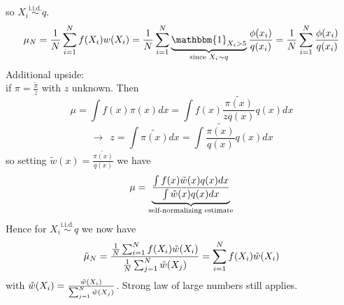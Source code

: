 \documentclass{article}
\begin{document}
	so $X_i \stackrel{\text{i.i.d.}}{\sim} q $.
	\begin{equation*}
		\mu_N= \frac{1}{N} \sum_{i=1}^N f(X_i)w(X_i) = \frac{1}{N} \sum_{i=1}^N \underbrace{\mathbbm{1}_{X_i>5} }_{\text{since } X_i \sim q }\frac{\phi(x_i)}{q(x_i)}  = \frac{1}{N} \sum_{i=1}^N\frac{\phi(x_i)}{q(x_i)} 
	\end{equation*}
	Additional upside:\\
	if $\pi= \frac{\tilde{\pi}}{z}$ with $z$ unknown. Then
	\begin{equation*}
		\mu = \int f(x) \pi (x) dx = \int f(x)\frac{\tilde{\pi(x)}}{z q(x)} q(x) dx 
	\end{equation*}
	\begin{equation*}
		\rightarrow \ \ z= \int \tilde{\pi(x)} dx = \int \frac{\tilde{\pi(x)}}{q(x)}q(x) dx 
	\end{equation*}
	so setting $\tilde{w}(x)=\frac{\tilde{\pi(x)}}{q(x)}$ we have 
	\begin{equation*}
		\mu = \underbrace{\frac{\int f(x) \Tilde{w}(x) q(x) dx }{\int \Tilde{w}(x) q(x) dx}}_{\text{self-normalizing estimate}}
	\end{equation*}
	Hence for $X_i \stackrel{\text{i.i.d.}}{\sim} q $ we now have 
	\begin{equation*}
		\Tilde{\mu}_N = \frac{\frac{1}{N} \sum_{i=1}^N f(X_i)\Tilde{w}(X_i)}{\frac{1}{N} \sum_{j=1}^N \Tilde{w}(X_j)} = \sum_{i=1}^N  f(X_i) \hat{w}(X_i)
	\end{equation*}
	with $\hat{w}(X_i)= \frac{\Tilde{w}(X_i)}{\sum_{j=1}^N \Tilde{w}(X_j)}$. Strong law of large numbers still applies. \\
\end{document}
